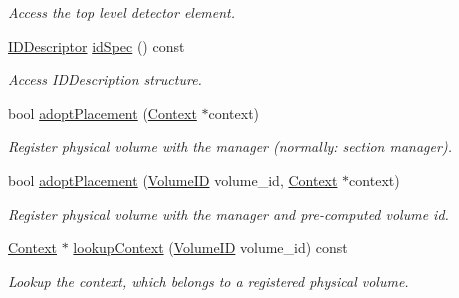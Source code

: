 \begin{DoxyCompactItemize}
\begin{DoxyCompactList}\small\item\em Access the top level detector element. \item\end{DoxyCompactList}\item 
\hyperlink{class_d_d4hep_1_1_geometry_1_1_i_d_descriptor}{IDDescriptor} \hyperlink{class_d_d4hep_1_1_geometry_1_1_volume_manager_a9a972916fb9871361da60077f80c9ef7}{idSpec} () const 
\begin{DoxyCompactList}\small\item\em Access IDDescription structure. \item\end{DoxyCompactList}\item 
bool \hyperlink{class_d_d4hep_1_1_geometry_1_1_volume_manager_acfeddaf04beb69692702c453a9ad9933}{adoptPlacement} (\hyperlink{class_d_d4hep_1_1_geometry_1_1_volume_manager_context}{Context} $\ast$context)
\begin{DoxyCompactList}\small\item\em Register physical volume with the manager (normally: section manager). \item\end{DoxyCompactList}\item 
bool \hyperlink{class_d_d4hep_1_1_geometry_1_1_volume_manager_ac7ad07c472812b32144b3c2a8b4475b2}{adoptPlacement} (\hyperlink{class_d_d4hep_1_1_geometry_1_1_volume_manager_ab1f746b561c93be38bc7c6e66fc8ca8a}{VolumeID} volume\_\-id, \hyperlink{class_d_d4hep_1_1_geometry_1_1_volume_manager_context}{Context} $\ast$context)
\begin{DoxyCompactList}\small\item\em Register physical volume with the manager and pre-\/computed volume id. \item\end{DoxyCompactList}\item 
\hyperlink{class_d_d4hep_1_1_geometry_1_1_volume_manager_context}{Context} $\ast$ \hyperlink{class_d_d4hep_1_1_geometry_1_1_volume_manager_ae79db756ac5864d0f36bb61e09c95e70}{lookupContext} (\hyperlink{class_d_d4hep_1_1_geometry_1_1_volume_manager_ab1f746b561c93be38bc7c6e66fc8ca8a}{VolumeID} volume\_\-id) const 
\begin{DoxyCompactList}\small\item\em Lookup the context, which belongs to a registered physical volume. \item\end{DoxyCompactList}\item 

\end{DoxyCompactItemize}
